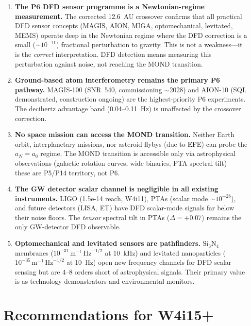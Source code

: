 \documentclass[11pt]{article}
\theoremstyle{definition}
\theoremstyle{remark}
\newcommand{\sqrtHz}{\,\mathrm{Hz}^{-1/2}}
\newcommand{\azero}{a_0}
\begin{document}
\begin{enumerate}
\item \textbf{The P6 DFD sensor programme is a Newtonian-regime
  measurement.} The corrected 12.6~AU crossover confirms that all
  practical DFD sensor concepts (MAGIS, AION, MIGA, optomechanical,
  levitated, MEMS) operate deep in the Newtonian regime where the
  DFD correction is a small ($\sim 10^{-11}$) fractional perturbation
  to gravity. This is not a weakness---it is the \emph{correct}
  interpretation. DFD detection means measuring this perturbation
  against noise, not reaching the MOND transition.

\item \textbf{Ground-based atom interferometry remains the primary
  P6 pathway.} MAGIS-100 (SNR~540, commissioning $\sim$2028) and
  AION-10 (SQL demonstrated, construction ongoing) are the highest-priority
  P6 experiments. The decihertz advantage band (0.04--0.11~Hz) is
  unaffected by the crossover correction.

\item \textbf{No space mission can access the MOND transition.}
  Neither Earth orbit, interplanetary missions, nor asteroid flybys
  (due to EFE) can probe the $a_N = \azero$ regime. The MOND
  transition is accessible only via astrophysical observations
  (galactic rotation curves, wide binaries, PTA spectral tilt)---these
  are P5/P14 territory, not P6.

\item \textbf{The GW detector scalar channel is negligible in all
  existing instruments.} LIGO (1.5e-14 reach, W4i11), PTAs (scalar
  mode $\sim 10^{-28}$), and future detectors (LISA, ET) have
  DFD scalar-mode signals far below their noise floors. The
  \emph{tensor} spectral tilt in PTAs ($\Delta = +0.07$) remains
  the only GW-detector DFD observable.

\item \textbf{Optomechanical and levitated sensors are pathfinders.}
  Si$_3$N$_4$ membranes ($10^{-31}\,\mathrm{m}^{-1}\sqrtHz$ at 10~kHz)
  and levitated nanoparticles ($10^{-35}\,\mathrm{m}^{-1}\sqrtHz$
  at 10~Hz) open new frequency channels for DFD scalar sensing but
  are 4--8 orders short of astrophysical signals. Their primary
  value is as technology demonstrators and environmental monitors.
\end{enumerate}

\section*{Recommendations for W4i15+}
\end{document}
